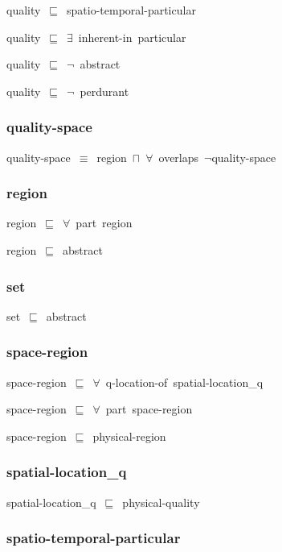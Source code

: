 \documentclass{article}
\begin{document}
quality~\ensuremath{\sqsubseteq}~spatio-temporal-particular~

quality~\ensuremath{\sqsubseteq}~\ensuremath{\exists}~inherent-in~particular~

quality~\ensuremath{\sqsubseteq}~\ensuremath{\lnot}~abstract

quality~\ensuremath{\sqsubseteq}~\ensuremath{\lnot}~perdurant

\subsubsection*{quality-space}

quality-space~\ensuremath{\equiv}~region~\ensuremath{\sqcap}~\ensuremath{\forall}~overlaps~\ensuremath{\lnot}quality-space

\subsubsection*{region}

region~\ensuremath{\sqsubseteq}~\ensuremath{\forall}~part~region~

region~\ensuremath{\sqsubseteq}~abstract~

\subsubsection*{set}

set~\ensuremath{\sqsubseteq}~abstract~

\subsubsection*{space-region}

space-region~\ensuremath{\sqsubseteq}~\ensuremath{\forall}~q-location-of~spatial-location\_q~

space-region~\ensuremath{\sqsubseteq}~\ensuremath{\forall}~part~space-region~

space-region~\ensuremath{\sqsubseteq}~physical-region~

\subsubsection*{spatial-location_q}

spatial-location\_q~\ensuremath{\sqsubseteq}~physical-quality~

\subsubsection*{spatio-temporal-particular}
\end{document}
